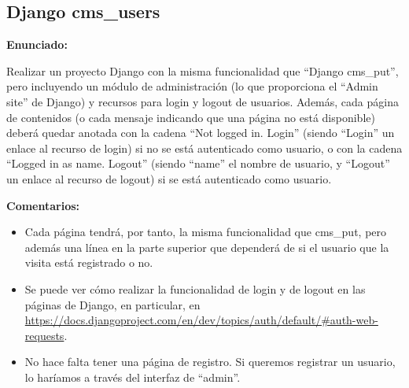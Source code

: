 %

\subsection{Django cms\_users}
\label{subsec:django-users}

\textbf{Enunciado:}

Realizar un proyecto Django con la misma funcionalidad que ``Django cms\_put'', pero incluyendo un módulo de administración (lo que proporciona el ``Admin site'' de Django) y recursos para login y logout de usuarios. Además, cada página de contenidos (o cada mensaje indicando que una página no está disponible) deberá quedar anotada con la cadena ``Not logged in. Login'' (siendo ``Login'' un enlace al recurso de login) si no se está autenticado como usuario, o con la cadena ``Logged in as name. Logout'' (siendo ``name'' el nombre de usuario, y ``Logout'' un enlace al recurso de logout) si se está autenticado como usuario.

\textbf{Comentarios:}

\begin{itemize}
  \item Cada página tendrá, por tanto, la misma funcionalidad que cms\_put, pero además una línea en la parte superior que dependerá de si el usuario que la visita está registrado o no.

  \item Se puede ver cómo realizar la funcionalidad de login y de logout en las páginas de Django, en particular, en \url{https://docs.djangoproject.com/en/dev/topics/auth/default/#auth-web-requests}.

  \item No hace falta tener una página de registro. Si queremos registrar un usuario, lo haríamos a través del interfaz de ``admin''.
\end{itemize}




